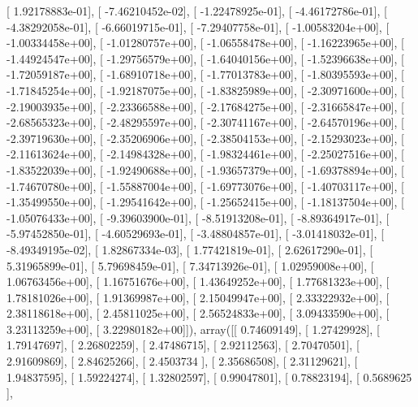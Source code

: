 \documentclass{article}
\begin{document}
       [  1.92178883e-01],
       [ -7.46210452e-02],
       [ -1.22478925e-01],
       [ -4.46172786e-01],
       [ -4.38292058e-01],
       [ -6.66019715e-01],
       [ -7.29407758e-01],
       [ -1.00583204e+00],
       [ -1.00334458e+00],
       [ -1.01280757e+00],
       [ -1.06558478e+00],
       [ -1.16223965e+00],
       [ -1.44924547e+00],
       [ -1.29756579e+00],
       [ -1.64040156e+00],
       [ -1.52396638e+00],
       [ -1.72059187e+00],
       [ -1.68910718e+00],
       [ -1.77013783e+00],
       [ -1.80395593e+00],
       [ -1.71845254e+00],
       [ -1.92187075e+00],
       [ -1.83825989e+00],
       [ -2.30971600e+00],
       [ -2.19003935e+00],
       [ -2.23366588e+00],
       [ -2.17684275e+00],
       [ -2.31665847e+00],
       [ -2.68565323e+00],
       [ -2.48295597e+00],
       [ -2.30741167e+00],
       [ -2.64570196e+00],
       [ -2.39719630e+00],
       [ -2.35206906e+00],
       [ -2.38504153e+00],
       [ -2.15293023e+00],
       [ -2.11613624e+00],
       [ -2.14984328e+00],
       [ -1.98324461e+00],
       [ -2.25027516e+00],
       [ -1.83522039e+00],
       [ -1.92490688e+00],
       [ -1.93657379e+00],
       [ -1.69378894e+00],
       [ -1.74670780e+00],
       [ -1.55887004e+00],
       [ -1.69773076e+00],
       [ -1.40703117e+00],
       [ -1.35499550e+00],
       [ -1.29541642e+00],
       [ -1.25652415e+00],
       [ -1.18137504e+00],
       [ -1.05076433e+00],
       [ -9.39603900e-01],
       [ -8.51913208e-01],
       [ -8.89364917e-01],
       [ -5.97452850e-01],
       [ -4.60529693e-01],
       [ -3.48804857e-01],
       [ -3.01418032e-01],
       [ -8.49349195e-02],
       [  1.82867334e-03],
       [  1.77421819e-01],
       [  2.62617290e-01],
       [  5.31965899e-01],
       [  5.79698459e-01],
       [  7.34713926e-01],
       [  1.02959008e+00],
       [  1.06763456e+00],
       [  1.16751676e+00],
       [  1.43649252e+00],
       [  1.77681323e+00],
       [  1.78181026e+00],
       [  1.91369987e+00],
       [  2.15049947e+00],
       [  2.33322932e+00],
       [  2.38118618e+00],
       [  2.45811025e+00],
       [  2.56524833e+00],
       [  3.09433590e+00],
       [  3.23113259e+00],
       [  3.22980182e+00]]), array([[ 0.74609149],
       [ 1.27429928],
       [ 1.79147697],
       [ 2.26802259],
       [ 2.47486715],
       [ 2.92112563],
       [ 2.70470501],
       [ 2.91609869],
       [ 2.84625266],
       [ 2.4503734 ],
       [ 2.35686508],
       [ 2.31129621],
       [ 1.94837595],
       [ 1.59224274],
       [ 1.32802597],
       [ 0.99047801],
       [ 0.78823194],
       [ 0.5689625 ],
\end{document}
